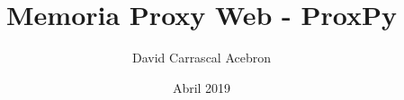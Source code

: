 \documentclass[oneside]{book}
\title{Memoria Proxy Web - ProxPy }
\author{David Carrascal Acebron}
\date{Abril 2019}
\begin{document}
\maketitle
\tableofcontents{}
 


\end{document}
